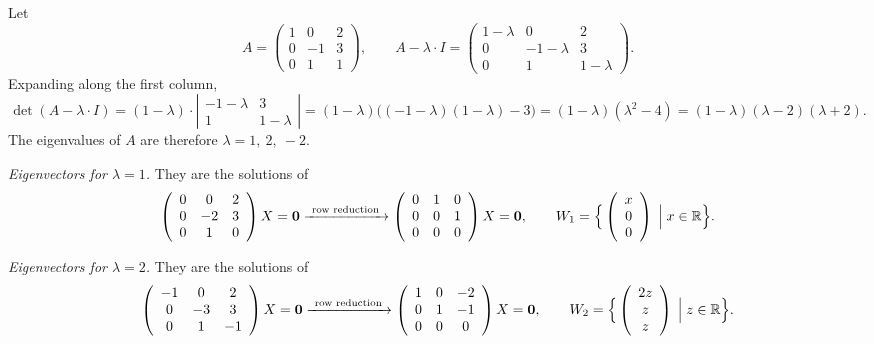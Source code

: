 \begin{example}
Let
\[
A=\left( \begin{array}{ccc} 1 & 0 & 2\\ 0 & -1 & 3\\ 0 & 1 & 1 \end{array} \right),
\qquad
A-\lambda \cdot I=\left( \begin{array}{ccc} 1-\lambda & 0 & 2\\ 0 & -1-\lambda & 3\\ 0 & 1 & 1-\lambda \end{array} \right).
\]
Expanding along the first column,
\[
\det(A-\lambda \cdot I)=
(1-\lambda)\cdot \left| \begin{array}{cc} -1-\lambda & 3\\ 1 & 1-\lambda \end{array} \right|
= (1-\lambda)\big((-1-\lambda)(1-\lambda)-3\big)
= (1-\lambda)(\lambda^2-4) = (1-\lambda)(\lambda-2)(\lambda+2).
\]
The eigenvalues of $A$ are therefore $\lambda = 1,\ 2,\ -2$.

\medskip
\noindent\emph{Eigenvectors for $\lambda = 1$.} They are the solutions of
\[
\left( \begin{array}{ccc} 0 & 0 & 2\\ 0 & -2 & 3\\ 0 & 1 & 0 \end{array} \right)X = \mathbf{0}
\xrightarrow{\ \text{row reduction}\ }
\left( \begin{array}{ccc} 0 & 1 & 0 \\ 0 & 0 & 1\\ 0 & 0 & 0 \end{array} \right)X = \mathbf{0},
\qquad
W_1 = \Big\{ \left( \begin{array}{c} x \\ 0 \\ 0 \end{array} \right) \;\Big|\; x\in \mathbb{R} \Big\}.
\]

\noindent\emph{Eigenvectors for $\lambda = 2$.} They are the solutions of
\[
\left( \begin{array}{ccc} -1 & 0 & 2\\ 0 & -3 & 3\\ 0 & 1 & -1 \end{array} \right)X = \mathbf{0}
\xrightarrow{\ \text{row reduction}\ }
\left( \begin{array}{ccc} 1 & 0 & -2\\ 0 & 1 & -1\\ 0 & 0 & 0 \end{array} \right)X = \mathbf{0},
\qquad
W_2 = \Big\{ \left( \begin{array}{c} 2z \\ z \\ z \end{array} \right) \;\Big|\; z\in \mathbb{R} \Big\}.
\]


\end{example}
